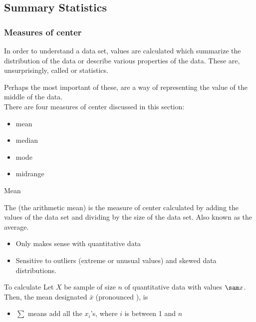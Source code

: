 \documentclass[xcolor=table, aspectratio=169, bigger, handout]{beamer}
\begin{document}
% 
%
\subsection{Summary Statistics}

\begin{frame}
\frametitle{Measures of center}
\begin{block}{}
In order to understand a data set, values are calculated which summarize the distribution of the data or describe various properties of the data. These are, unsurprisingly, called  or  statistics.
\end{block}
\pause
\begin{block}{}
Perhaps the most important of these,  are a way of  representing the value of the middle of the data.\\
\medskip
There are four measures of center discussed in this section:
\begin{itemize}
\item mean
\item median
\item mode
\item midrange
\end{itemize} 
\end{block}
\end{frame}

\begin{frame}{Mean}
\begin{block}{}
The  (the arithmetic mean) is the measure of center calculated by adding the values of the data set and dividing by the size of the data set. Also known as the average.
\begin{itemize}
\item Only makes sense with quantitative data
\item Sensitive to outliers (extreme or unusual values) and skewed data distributions.
\end{itemize}
\end{block}

\pause
\begin{block}{To calculate}
Let $X$ be sample of size $n$ of quantitative data with values $\sam x$. Then, the mean designated $\bar x$ (pronounced ), is\\ \smallskip
{}
\begin{itemize}
\item $\sum$ means add all the $x_i$'s, where $i$ is between 1 and $n$
\end{itemize}
\end{block}
\end{frame}
\end{document}
